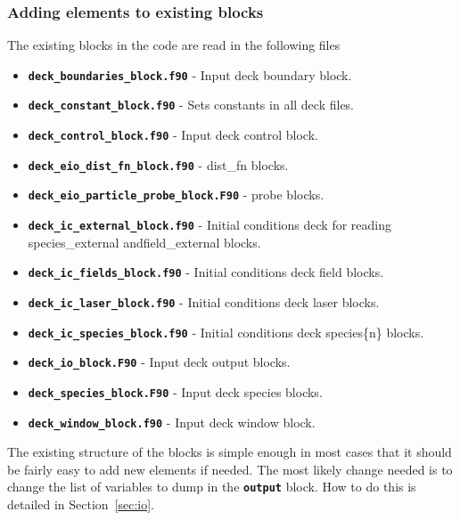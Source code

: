 \documentclass[12pt,a4paper]{article}
\newcommand{\inlinecode}[1]{{\color{warwickred} \bf\texttt{#1}}}
\newcommand{\sect}[1]{Section~\ref{sec:#1}}
\begin{document}
\subsubsection{Adding elements to existing blocks}
The existing blocks in the code are read in the following files
\begin{itemize}
\item \inlinecode{deck\_boundaries\_block.f90} - Input deck boundary block.
\item \inlinecode{deck\_constant\_block.f90} - Sets constants in all deck files.
\item \inlinecode{deck\_control\_block.f90} - Input deck control block.
\item \inlinecode{deck\_eio\_dist\_fn\_block.f90} - dist\_fn blocks.
\item \inlinecode{deck\_eio\_particle\_probe\_block.F90} - probe blocks.
\item \inlinecode{deck\_ic\_external\_block.f90} - Initial conditions deck for
  reading species\_external and\linebreak field\_external blocks.
\item \inlinecode{deck\_ic\_fields\_block.f90} - Initial conditions deck field
  blocks.
\item \inlinecode{deck\_ic\_laser\_block.f90} - Initial conditions deck laser
  blocks.
\item \inlinecode{deck\_ic\_species\_block.f90} - Initial conditions deck
  species\{n\} blocks.
\item \inlinecode{deck\_io\_block.F90} - Input deck output blocks.
\item \inlinecode{deck\_species\_block.F90} - Input deck species blocks.
\item \inlinecode{deck\_window\_block.f90} - Input deck window block.
\end{itemize}

The existing structure of the blocks is simple enough in most cases that it
should be fairly easy to add new elements if needed. The most likely change
needed is to change the list of variables to dump in the \inlinecode{output}
block. How to do this is detailed in \sect{io}.
\end{document}

